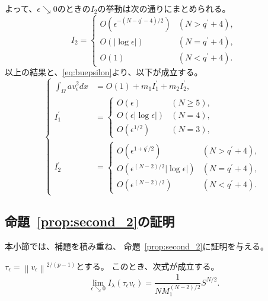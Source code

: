 よって、$\epsilon \searrow 0$のときの$I_2$の挙動は次の通りにまとめられる。
\[
 I_2 = \begin{cases}
        O(\epsilon^{-(N-q^\prime-4)/2}) & (N > q^\prime + 4),\\
        O(\lvert \log \epsilon \rvert) & (N = q^\prime + 4), \\ 
        O(1) & (N < q^\prime + 4).
       \end{cases}
\]
以上の結果と、\eqref{eq:buepsilon}より、以下が成立する。
\begin{equation}
 \left\{ 
 \begin{aligned}
  \int_\Omega a v_\epsilon^2 dx &= O(1) + m_1 I_1^\prime + m_2
  I_2^\prime, \\
  I_1^\prime &= \begin{cases}
                 O(\epsilon) & (N \geq 5), \\
                 O(\epsilon \lvert \log \epsilon \rvert) & (N = 4), \\
                 O(\epsilon^{1/2}) & (N = 3),
                \end{cases} \\
  I_2^\prime &= \begin{cases}
                 O(\epsilon^{1 + q^\prime/2 }) & (N > q^\prime + 4), \\
                 O(\epsilon^{(N-2)/2} \lvert \log \epsilon \rvert) & (N =
                 q^\prime + 4), \\
                 O(\epsilon^{(N-2)/2}) & (N < q^\prime + 4).
                \end{cases}
 \end{aligned} \right. \label{eq:av_epsilon}
\end{equation}

\subsection{命題~\ref{prop:second_2}の証明}

本小節では、補題を積み重ね、
命題~\ref{prop:second_2}に証明を与える。

\begin{lem} \label{lem:tauepsilon}
 $\tau_\epsilon = \left\| v_\epsilon \right\|^{2/(p-1)}$とする。
 このとき、次式が成立する。
 \begin{equation}
  \lim_{\epsilon \searrow 0} I_\lambda (\tau_\epsilon v_\epsilon) = 
   \frac{1}{NM_1^{(N-2)/2}} S^{N/2}. \label{eq:limI}
 \end{equation}
\end{lem}

